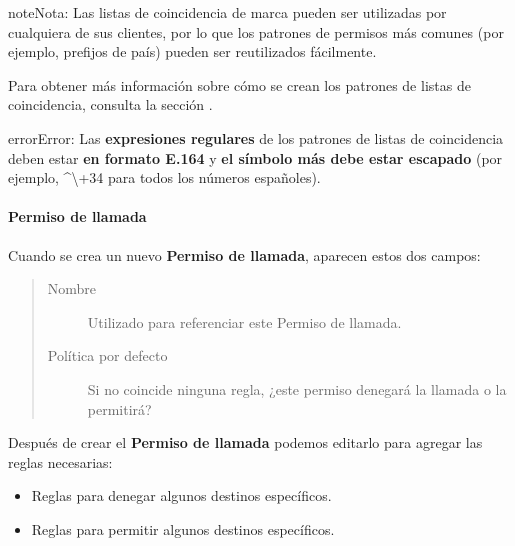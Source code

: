 \documentclass[letterpaper,10pt,spanish]{sphinxmanual}
\begin{document}
\begin{notice}{note}{Nota:}
Las listas de coincidencia de marca pueden ser utilizadas por cualquiera de sus clientes, por lo que los patrones de permisos más comunes (por ejemplo, prefijos de país) pueden ser reutilizados fácilmente.
\end{notice}

Para obtener más información sobre cómo se crean los patrones de listas de coincidencia, consulta la sección {\hyperref[administration_portal/client/vpbx/routing_tools/match_lists:match\string-lists]{}}.

\begin{notice}{error}{Error:}
Las \textbf{expresiones regulares} de los patrones de listas de coincidencia deben estar \textbf{en formato E.164} y \textbf{el símbolo más debe estar escapado} (por ejemplo, \textasciicircum{}\textbackslash{}+34 para todos los números españoles).
\end{notice}


\paragraph{Permiso de llamada}
\label{administration_portal/client/vpbx/user_configuration/call_acls:call-acl}
Cuando se crea un nuevo \textbf{Permiso de llamada}, aparecen estos dos campos:
\begin{quote}
\begin{description}
\item[{Nombre}] \leavevmode
Utilizado para referenciar este Permiso de llamada.

\item[{Política por defecto}] \leavevmode
Si no coincide ninguna regla, ¿este permiso denegará la llamada o la permitirá?

\end{description}
\end{quote}

Después de crear el \textbf{Permiso de llamada} podemos editarlo para agregar las reglas necesarias:
\begin{itemize}
\item {} 
Reglas para denegar algunos destinos específicos.

\item {} 
Reglas para permitir algunos destinos específicos.

\end{itemize}
\end{document}
